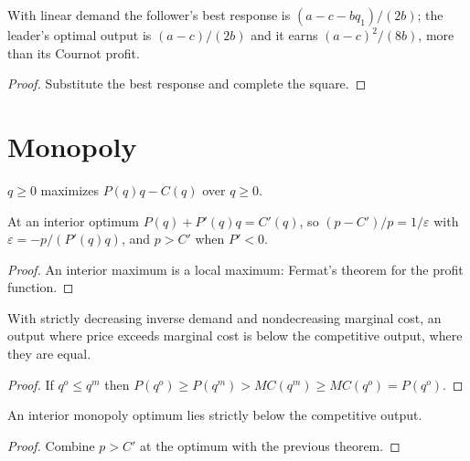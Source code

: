 \begin{theorem}
\label{thm:stackelberg}
\leanok
With linear demand the follower's best response is $(a - c - bq_1)/(2b)$; the leader's optimal output is
$(a-c)/(2b)$ and it earns $(a-c)^2/(8b)$, more than its Cournot profit.
\end{theorem}
\begin{proof}
\leanok
Substitute the best response and complete the square.
\end{proof}

\section{Monopoly}

\begin{definition}
\label{def:monopoly}
\leanok
$q \ge 0$ maximizes $P(q) q - C(q)$ over $q \ge 0$.
\end{definition}

\begin{theorem}
\label{thm:monopoly-foc}
\leanok
{}
At an interior optimum $P(q) + P'(q) q = C'(q)$, so $(p - C')/p = 1/\varepsilon$ with
$\varepsilon = -p/(P'(q) q)$, and $p > C'$ when $P' < 0$.
\end{theorem}
\begin{proof}
\leanok
An interior maximum is a local maximum: Fermat's theorem for the profit function.
\end{proof}

\begin{theorem}
\label{thm:monopoly-under}
\leanok
With strictly decreasing inverse demand and nondecreasing marginal cost, an output where price exceeds marginal
cost is below the competitive output, where they are equal.
\end{theorem}
\begin{proof}
\leanok
If $q^o \le q^m$ then $P(q^o) \ge P(q^m) > MC(q^m) \ge MC(q^o) = P(q^o)$.
\end{proof}

\begin{corollary}
\label{cor:monopoly-under}
\leanok
{}
An interior monopoly optimum lies strictly below the competitive output.
\end{corollary}
\begin{proof}
\leanok
Combine $p > C'$ at the optimum with the previous theorem.
\end{proof}

